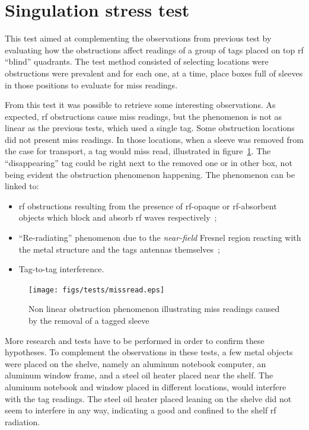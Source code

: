 \section{Singulation stress test}

This test aimed at complementing the observations from previous test by evaluating how the obstructions affect readings of a group of tags placed on top \ac{rf} ``blind'' quadrants.
The test method consisted of selecting locations were obstructions were prevalent and for each one, at a time, place boxes full of sleeves in those positions to evaluate for miss readings.

From this test it was possible to retrieve some interesting observations. 
As expected, \ac{rf} obstructions cause miss readings, but the phenomenon is not as linear as the previous tests, which used a single tag. 
Some obstruction locations did not present miss readings. In those locations, when a sleeve was removed from the case for transport, a tag would miss read, illustrated in figure~\ref{fig:missreading}. The ``disappearing'' tag could be right next to the removed one or in other box, not being evident the obstruction phenomenon happening.
The phenomenon can be linked to:

\begin{itemize}
    \item \ac{rf} obstructions resulting from the presence of \ac{rf}-opaque or \ac{rf}-absorbent objects which block and absorb \ac{rf} waves respectively~\cite{lahiriRFIDSourcebook2005};
    \item ``Re-radiating'' phenomenon due to the \emph{near-field} Fresnel region reacting with the metal structure and the tags antennas themselves~\cite{ElectromagneticRadiationField};
    \item Tag-to-tag interference.
\end{itemize}

\begin{figure}
    \centering
    \texttt{[image: figs/tests/missread.eps]}
    \caption{Non linear obstruction phenomenon illustrating miss readings caused by the removal of a tagged sleeve}
    \label{fig:missreading}
\end{figure}

More research and tests have to be performed in order to confirm these hypotheses.
To complement the observations in these tests, a few metal objects were placed on the shelve, namely an aluminum notebook computer, an aluminum window frame, and a steel oil heater placed near the shelf.
The aluminum notebook and window placed in different locations, would interfere with the tag readings. The steel oil heater placed leaning on the shelve did not seem to interfere in any way, indicating a good and confined to the shelf \ac{rf} radiation.

